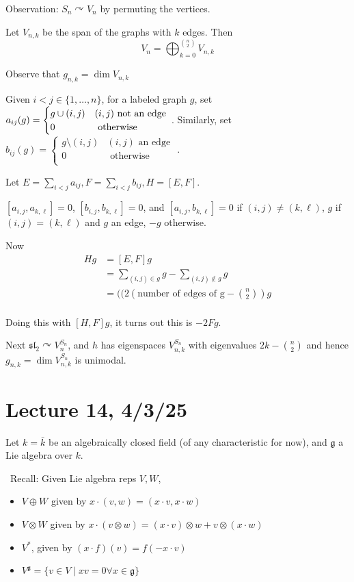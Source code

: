 \documentclass[x11names,reqno,14pt]{extarticle}
\newcommand{\mk}[1]{\mathfrak{#1}}
\newcommand{\g}{\mk{g}}
\newcommand{\bark}{\bar{k}}
\renewcommand{\sl}{\mk{s}\mk{l}}
\begin{document}
Observation: $S_n\curvearrowright V_n$ by permuting the vertices. 

Let $V_{n,k}$ be the span of the graphs with $k$ edges. Then 
\[
V_n = \bigoplus_{k=0}^{n\choose 2} V_{n,k}
\]

Observe that $g_{n,k} = \dim V_{n,k}$

Given $i < j \in \{1,\dots,n\}$, for a labeled graph $g$, set $a_{ij}(g) = \begin{cases} g \cup (i,j) & \text(i,j)\text{ not an edge } \\ 0 & \text{ otherwise } \\ \end{cases}$. Similarly, set $b_{ij}(g) = \begin{cases} g\setminus(i,j)&(i,j)\text{ an edge }\\ 0 & \text{ otherwise } \\ \end{cases}$.

Let $E = \sum_{i<j}a_{ij}, F = \sum_{i<j}b_{ij}, H = [E, F]$. 

$[a_{i,j},a_{k,\ell}] = 0$, $[b_{i,j},b_{k,\ell}] = 0$, and $[a_{i,j},b_{k,\ell}] = 0$ if $(i,j)\neq(k,\ell)$, $g$ if $(i,j) = (k,\ell)$ and $g$ an edge, $-g$ otherwise. 

Now
\begin{align*}
Hg & = [E,F]g \\
& = \sum_{(i,j) \in g}g - \sum_{(i,j) \not\in g}g \\
& = ((2(\text{number of edges of g} - {n\choose 2})g \\
\end{align*}

Doing this with $[H,F]g$, it turns out this is $-2Fg$. 

Next $\sl_2\curvearrowright V_n^{S_n}$, and $h$ has eigenspaces $V_{n,k}^{S_n}$ with eigenvalues $2k - {n\choose2}$ and hence $g_{n,k} = \dim V_{n,k}^{S_n}$ is unimodal. 


\section*{Lecture 14, 4/3/25}

Let $k = \bark$ be an algebraically closed field (of any characteristic for now), and $\g$ a Lie algebra over $k$. 

\exm
\,
Recall: Given Lie algebra reps $V, W$, 
\begin{itemize}

\item $V\oplus W$ given by $x\cdot(v,w) = (x\cdot v, x\cdot w)$

\item $V\otimes W$ given by $x\cdot(v\otimes w) = (x\cdot v)\otimes w + v\otimes(x\cdot w)$

\item $V^*$, given by $(x\cdot f)(v) = f(-x\cdot v )$

\item $V^\g = \{v\in V \mid xv = 0 \forall x \in \g\}$

\end{itemize}
\end{document}
